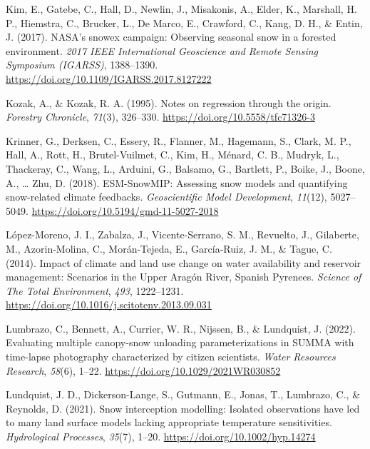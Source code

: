 \documentclass[
]{agujournal2019}
\newlength{\cslhangindent}
\newenvironment{CSLReferences}[2] %
 {\begin{list}{}{%
  \setlength{\itemindent}{0pt}
  \setlength{\leftmargin}{0pt}
  \setlength{\parsep}{0pt}
  \ifodd #1
   \setlength{\leftmargin}{\cslhangindent}
   \setlength{\itemindent}{-1\cslhangindent}
  \fi
  \setlength{\itemsep}{#2\baselineskip}}}
 {\end{list}}
\begin{document}
\begin{CSLReferences}{1}{0}
Kim, E., Gatebe, C., Hall, D., Newlin, J., Misakonis, A., Elder, K.,
Marshall, H. P., Hiemstra, C., Brucker, L., De Marco, E., Crawford, C.,
Kang, D. H., \& Entin, J. (2017). {NASA}'s snowex campaign: {Observing}
seasonal snow in a forested environment. \emph{2017 {IEEE} International
Geoscience and Remote Sensing Symposium ({IGARSS})}, 1388--1390.
\url{https://doi.org/10.1109/IGARSS.2017.8127222}

Kozak, A., \& Kozak, R. A. (1995). Notes on regression through the
origin. \emph{Forestry Chronicle}, \emph{71}(3), 326--330.
\url{https://doi.org/10.5558/tfc71326-3}

Krinner, G., Derksen, C., Essery, R., Flanner, M., Hagemann, S., Clark,
M. P., Hall, A., Rott, H., Brutel-Vuilmet, C., Kim, H., Ménard, C. B.,
Mudryk, L., Thackeray, C., Wang, L., Arduini, G., Balsamo, G., Bartlett,
P., Boike, J., Boone, A., \ldots{} Zhu, D. (2018). {ESM-SnowMIP}:
{Assessing} snow models and quantifying snow-related climate feedbacks.
\emph{Geoscientific Model Development}, \emph{11}(12), 5027--5049.
\url{https://doi.org/10.5194/gmd-11-5027-2018}

López-Moreno, J. I., Zabalza, J., Vicente-Serrano, S. M., Revuelto, J.,
Gilaberte, M., Azorin-Molina, C., Morán-Tejeda, E., García-Ruiz, J. M.,
\& Tague, C. (2014). Impact of climate and land use change on water
availability and reservoir management: {Scenarios} in the {Upper
Arag{ó}n River}, {Spanish Pyrenees}. \emph{Science of The Total
Environment}, \emph{493}, 1222--1231.
\url{https://doi.org/10.1016/j.scitotenv.2013.09.031}

Lumbrazo, C., Bennett, A., Currier, W. R., Nijssen, B., \& Lundquist, J.
(2022). Evaluating multiple canopy-snow unloading parameterizations in
{SUMMA} with time-lapse photography characterized by citizen scientists.
\emph{Water Resources Research}, \emph{58}(6), 1--22.
\url{https://doi.org/10.1029/2021WR030852}

Lundquist, J. D., Dickerson-Lange, S., Gutmann, E., Jonas, T., Lumbrazo,
C., \& Reynolds, D. (2021). Snow interception modelling: {Isolated}
observations have led to many land surface models lacking appropriate
temperature sensitivities. \emph{Hydrological Processes}, \emph{35}(7),
1--20. \url{https://doi.org/10.1002/hyp.14274}


\end{CSLReferences}
\end{document}
